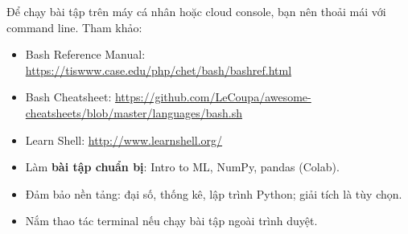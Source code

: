 \documentclass[12pt,a4paper]{article}
\newcommand{\mlccurl}[1]{\url{#1}}
\begin{document}
\begin{phuongphap}[title={Thao tác dòng lệnh}]
Để chạy bài tập trên máy cá nhân hoặc cloud console, bạn nên thoải mái với command line. Tham khảo:
\begin{itemize}
  \item Bash Reference Manual:
  \mlccurl{https://tiswww.case.edu/php/chet/bash/bashref.html}
  \item Bash Cheatsheet:
  \mlccurl{https://github.com/LeCoupa/awesome-cheatsheets/blob/master/languages/bash.sh}
  \item Learn Shell:
  \mlccurl{http://www.learnshell.org/}
\end{itemize}
\end{phuongphap}

\begin{tongket}[title={Tổng kết chương}]
\begin{itemize}
  \item Làm \textbf{bài tập chuẩn bị}: Intro to ML, NumPy, pandas (Colab).
  \item Đảm bảo nền tảng: đại số, thống kê, lập trình Python; giải tích là tùy chọn.
  \item Nắm thao tác terminal nếu chạy bài tập ngoài trình duyệt.
\end{itemize}
\end{tongket}
\end{document}
